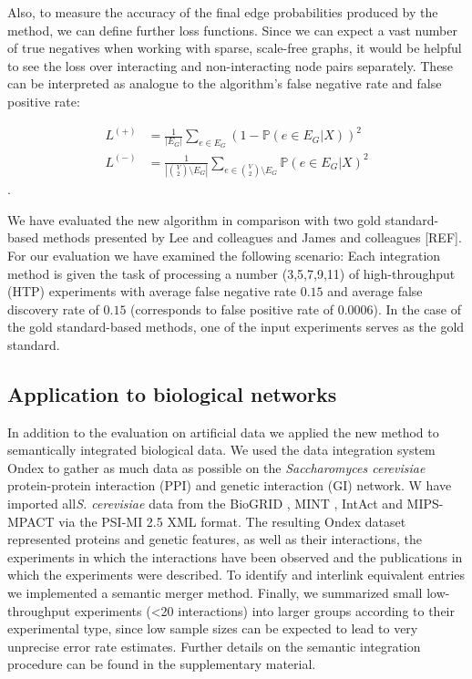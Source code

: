 \documentclass{bioinfo}
\newcommand{\prob}{\mathbb{P}}
\newcommand{\species}[1]{\textit{#1}}
\newcommand{\REF}{{\color{red}[REF]}}
\begin{document}
\begin{methods}
Also, to measure the accuracy of the final edge probabilities produced by the method, we can define further loss functions. Since we can expect a vast number of true negatives when working with sparse, scale-free graphs, it would be helpful to see the loss over interacting and non-interacting node pairs separately. These can be interpreted as analogue to the algorithm's false negative rate and false positive rate:

\begin{align} 
	L^{(+)} &= \frac{1}{|E_G|}\sum_{e \in E_G} (1 - \prob(e \in E_G|X))^2\\
	L^{(-)} &= \frac{1}{|\binom{V}{2} \setminus E_G|}\sum_{e \in \binom{V}{2} \setminus E_G} \prob(e \in E_G|X)^2
\end{align}.

We have evaluated the new algorithm in comparison with two gold standard-based methods presented by Lee and colleagues \citep{lee_probabilistic_2004} and James and colleagues \REF. For our evaluation we have examined the following scenario: Each integration method is given the task of processing a number (3,5,7,9,11) of high-throughput (HTP) experiments with average false negative rate $0.15$ and average false discovery rate of $0.15$ (corresponds to false positive rate of 0.0006). In the case of the gold standard-based methods, one of the input experiments serves as the gold standard.

\subsection{Application to biological networks}

In addition to the evaluation on artificial data we applied the new method to semantically integrated biological data. We used the data integration system Ondex \citep{koehler_graph-based_2006} to gather as much data as possible on the \species{Saccharomyces cerevisiae} protein-protein interaction (PPI) and genetic interaction (GI) network. W have imported all\species{S. cerevisiae} data from the BioGRID \citep{breitkreutz_biogrid_2008}, MINT \citep{chatr-aryamontri_mint:_2007}, IntAct \citep{hermjakob_intact:_2004} and MIPS-MPACT \citep{guldener_mpact:_2006} via the PSI-MI 2.5 XML \citep{kerrien_broadening_2007} format. The resulting Ondex dataset represented proteins and genetic features, as well as their interactions, the experiments in which the interactions have been observed and the publications in which the experiments were described. To identify and interlink equivalent entries we implemented a semantic merger method. Finally, we summarized small low-throughput experiments (<20 interactions) into larger groups according to their experimental type, since low sample sizes can be expected to lead to very unprecise error rate estimates. Further details on the semantic integration procedure can be found in the supplementary material.


\end{methods}
\end{document}
